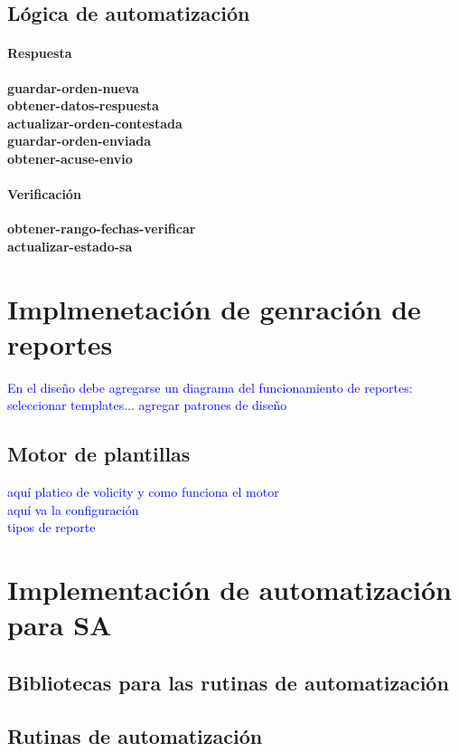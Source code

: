 \subsection{Lógica de automatización}
	\paragraph{Respuesta\\}
		\textbf{guardar-orden-nueva}\\
		\textbf{obtener-datos-respuesta}\\
		\textbf{actualizar-orden-contestada}\\
		\textbf{guardar-orden-enviada}\\
		\textbf{obtener-acuse-envio}
	\paragraph{Verificación\\}
		\textbf{obtener-rango-fechas-verificar}\\
		\textbf{actualizar-estado-sa}


\section{Implmenetación de genración de reportes}

\textcolor{blue}{En el diseño debe agregarse un diagrama del funcionamiento de reportes: seleccionar templates... agregar patrones de diseño}\\
\subsection{Motor de plantillas}
\textcolor{blue}{aquí platico de volicity y como funciona el motor}\\
\textcolor{blue}{aquí va la configuración}\\
\textcolor{blue}{tipos de reporte}

\section{Implementación de automatización para SA}
\subsection{Bibliotecas para las rutinas de automatización}
\subsection{Rutinas de automatización}

